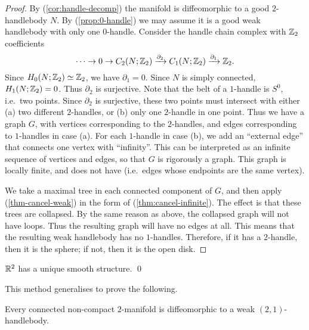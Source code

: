 \begin{proof}
By (\ref{cor:handle-decomp}) the manifold is diffeomorphic to a good $2$-handlebody $N$.
By (\ref{prop:0-handle}) we may assume it is a good weak handlebody with only one $0$-handle.
Consider the handle chain complex with $\mathbb{Z}_2$ coefficients
\[ \cdots\to0\to C_2(N;\mathbb{Z}_2)\xrightarrow{\partial_2}C_1(N;\mathbb{Z}_2)\xrightarrow{\partial_1}\mathbb{Z}_2. \]
Since $H_0(N;\mathbb{Z}_2)\simeq\mathbb{Z}_2$, we have $\partial_1=0$.
Since $N$ is simply connected, $H_1(N;\mathbb{Z}_2)=0$. Thus $\partial_2$ is surjective.
Note that the belt of a $1$-handle is $S^0$, i.e.\ two points.
Since $\partial_2$ is surjective,
these two points must intersect with either (a) two different $2$-handles,
or (b) only one $2$-handle in one point.
Thus we have a graph $G$,
with vertices corresponding to the $2$-handles,
and edges corresponding to $1$-handles in case (a).
For each $1$-handle in case (b), we add an ``external edge'' that connects one vertex with ``infinity''.
This can be interpreted as an infinite sequence of vertices and edges,
so that $G$ is rigorously a graph.
This graph is locally finite, and does not have 
(i.e.\ edges whose endpoints are the same vertex).

We take a maximal tree in each connected component of $G$,
and then apply (\ref{thm-cancel-weak}) in the form of (\ref{thm:cancel-infinite}).
The effect is that these trees are collapsed.
By the same reason as above, the collapsed graph will not have loops.
Thus the resulting graph will have no edges at all.
This means that the resulting weak handlebody has no $1$-handles.
Therefore, if it has a $2$-handle, then it is the sphere;
if not, then it is the open disk.
\end{proof}

\begin{corollary}
    $\mathbb{R}^2$ has a unique smooth structure. \qed
\end{corollary}

This method generalises to prove the following.

\begin{theorem}\label{thm:2-mfd-noncompact}
Every connected non-compact $2$-manifold is diffeomorphic to a weak $(2,1)$-handlebody.
\end{theorem}

